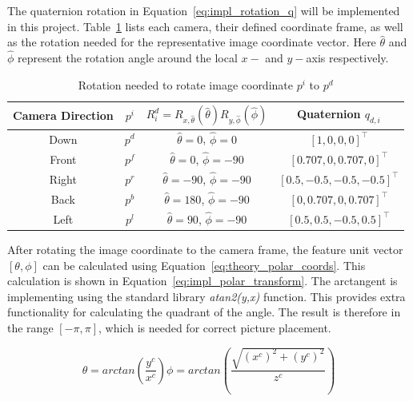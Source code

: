 The quaternion rotation in Equation~\eqref{eq:impl_rotation_q} will be implemented in this project. Table~\ref{tab:impl_quaternion_rotations} lists each camera, their defined coordinate frame, as well as the rotation needed for the representative image coordinate vector. Here $\hat{\theta}$ and $\hat{\phi}$ represent the rotation angle around the local $x-$ and $y-$axis respectively.

\begin{table}[!htb]
    \centering
    \begin{tabular}{|c|c|c|c|} \hline
        Camera Direction & $p^i$ & $R^d_i = R_{x,\hat{\theta}}(\hat{\theta})R_{y,\hat{\phi}}(\hat{\phi})$ & Quaternion $q_{d,i}$ \\ \hline \hline
        Down & $p^d$ & $\hat{\theta} = 0$, $\hat{\phi} = 0$ & $[1,0,0,0]^\top$ \\ \hline
        Front & $p^f$ & $\hat{\theta} = 0$, $\hat{\phi} = -90$ & $[0.707,0,0.707,0]^\top$ \\ \hline
        Right & $p^r$ & $\hat{\theta} = -90$, $\hat{\phi} = -90$ & $[0.5,-0.5,-0.5,-0.5]^\top$\\ \hline
        Back & $p^b$ & $\hat{\theta} = 180$, $\hat{\phi} = -90$ & $[0,0.707,0,0.707]^\top$ \\ \hline
        Left & $p^l$ & $\hat{\theta} = 90$, $\hat{\phi} = -90$ & $[0.5,0.5,-0.5,0.5]^\top$\\ \hline
    \end{tabular}
    \caption{Rotation needed to rotate image coordinate $p^i$ to $p^d$}
    \label{tab:impl_quaternion_rotations}
\end{table}

After rotating the image coordinate to the camera frame, the feature unit vector $[\theta, \phi]$ can be calculated using Equation~\eqref{eq:theory_polar_coords}. This calculation is shown in Equation~\eqref{eq:impl_polar_transform}. The arctangent is implementing using the standard library \emph{atan2(y,x)} function. This provides extra functionality for calculating the quadrant of the angle. The result is therefore in the range $[-\pi,\pi]$, which is needed for correct picture placement.

\begin{subequations}
    \begin{equation}
        \theta = arctan\left(\frac{y^c}{x^c}\right)
        \label{eq:impl_polar_transform_theta}
    \end{equation}
    \begin{equation}
        \phi = arctan\left(\frac{\sqrt{(x^c)^2 + (y^c)^2}}{z^c}\right)
        \label{eq:impl_polar_transform_phi}
    \end{equation}
    \label{eq:impl_polar_transform}
\end{subequations}

